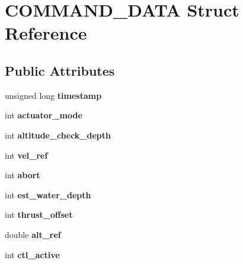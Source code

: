 \hypertarget{structCOMMAND__DATA}{}\section{C\+O\+M\+M\+A\+N\+D\+\_\+\+D\+A\+TA Struct Reference}
\label{structCOMMAND__DATA}
\subsection*{Public Attributes}
\begin{DoxyCompactItemize}
\item 
\mbox{\label{structCOMMAND__DATA_a24645af4764dc230149bb7a05844d640}} 
unsigned long {\bfseries timestamp}
\item 
\mbox{\label{structCOMMAND__DATA_a24e6e2290bcf3727d2e34747a5761252}} 
int {\bfseries actuator\+\_\+mode}
\item 
\mbox{\label{structCOMMAND__DATA_a7bb064d343f24ddec790e4fb0099b299}} 
int {\bfseries altitude\+\_\+check\+\_\+depth}
\item 
\mbox{\label{structCOMMAND__DATA_a5c95967ceccf61847c535d79ceb6e773}} 
int {\bfseries vel\+\_\+ref}
\item 
\mbox{\label{structCOMMAND__DATA_aa5dddce3518074ce18cb7eb1812dc5fc}} 
int {\bfseries abort}
\item 
\mbox{\label{structCOMMAND__DATA_a6f780ee38ec8f930ed096c05111333ee}} 
int {\bfseries est\+\_\+water\+\_\+depth}
\item 
\mbox{\label{structCOMMAND__DATA_a542c4bc095948d8b49308d6d0b6f34be}} 
int {\bfseries thrust\+\_\+offset}
\item 
\mbox{\label{structCOMMAND__DATA_a6586e78177f3d261d574d4e697a9b6bd}} 
double {\bfseries alt\+\_\+ref}
\item 
\mbox{\label{structCOMMAND__DATA_a5ead5281cf6875e0a70520da479e71a9}} 
int {\bfseries ctl\+\_\+active}
\item 

\end{DoxyCompactItemize}
